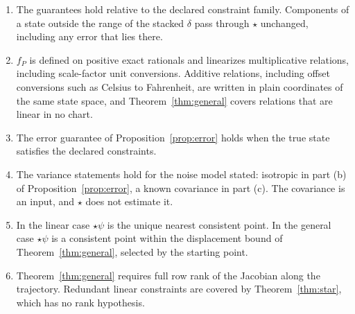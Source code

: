 \documentclass[11pt,letterpaper]{article}
\theoremstyle{plain}
\theoremstyle{definition}
\theoremstyle{remark}
\newcommand{\fP}{f_{P}}
\begin{document}
\begin{enumerate}
\item The guarantees hold relative to the declared constraint family. Components of a state outside the range of the stacked $\delta$ pass through $\star$ unchanged, including any error that lies there.
\item $\fP$ is defined on positive exact rationals and linearizes multiplicative relations, including scale-factor unit conversions. Additive relations, including offset conversions such as Celsius to Fahrenheit, are written in plain coordinates of the same state space, and Theorem~\ref{thm:general} covers relations that are linear in no chart.
\item The error guarantee of Proposition~\ref{prop:error} holds when the true state satisfies the declared constraints.
\item The variance statements hold for the noise model stated: isotropic in part (b) of Proposition~\ref{prop:error}, a known covariance in part (c). The covariance is an input, and $\star$ does not estimate it.
\item In the linear case $\star\psi$ is the unique nearest consistent point. In the general case $\star\psi$ is a consistent point within the displacement bound of Theorem~\ref{thm:general}, selected by the starting point.
\item Theorem~\ref{thm:general} requires full row rank of the Jacobian along the trajectory. Redundant linear constraints are covered by Theorem~\ref{thm:star}, which has no rank hypothesis.
\end{enumerate}
\end{document}
